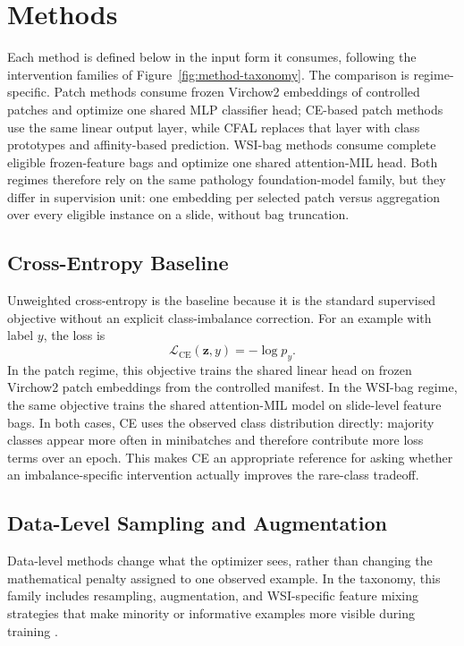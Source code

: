 \documentclass[11pt]{article}
\begin{document}
\section{Methods}
\label{sec:methods}
Each method is defined below in the input form it consumes, following the intervention families of Figure~\ref{fig:method-taxonomy}. The comparison is regime-specific. Patch methods consume frozen Virchow2 embeddings of controlled patches and optimize one shared MLP classifier head; CE-based patch methods use the same linear output layer, while CFAL replaces that layer with class prototypes and affinity-based prediction. WSI-bag methods consume complete eligible frozen-feature bags and optimize one shared attention-MIL head. Both regimes therefore rely on the same pathology foundation-model family, but they differ in supervision unit: one embedding per selected patch versus aggregation over every eligible instance on a slide, without bag truncation.

\subsection{Cross-Entropy Baseline}
Unweighted cross-entropy is the baseline because it is the standard supervised objective without an explicit class-imbalance correction. For an example with label $y$, the loss is
\begin{equation}
  \mathcal{L}_{\mathrm{CE}}(\mathbf{z},y) = -\log p_y.
  \label{eq:ce}
\end{equation}
In the patch regime, this objective trains the shared linear head on frozen Virchow2 patch embeddings from the controlled manifest. In the WSI-bag regime, the same objective trains the shared attention-MIL model on slide-level feature bags. In both cases, CE uses the observed class distribution directly: majority classes appear more often in minibatches and therefore contribute more loss terms over an epoch. This makes CE an appropriate reference for asking whether an imbalance-specific intervention actually improves the rare-class tradeoff.

\subsection{Data-Level Sampling and Augmentation}
Data-level methods change what the optimizer sees, rather than changing the mathematical penalty assigned to one observed example. In the taxonomy, this family includes resampling, augmentation, and WSI-specific feature mixing strategies that make minority or informative examples more visible during training \citep{saini2023tacklingClass}.
\end{document}

